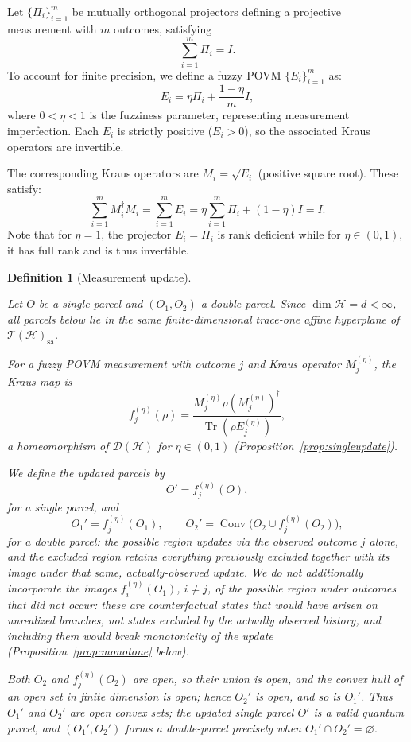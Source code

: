 \documentclass[11pt, onecolumn]{article}
\newtheorem{definition}{Definition}
\begin{document}
Let \(\{\Pi_i\}_{i=1}^m\) be mutually orthogonal projectors defining a projective measurement with $m$ outcomes, satisfying
\[
\sum_{i=1}^m\Pi_i = I.
\]
To account for finite precision, we define a fuzzy POVM \(\{E_i\}_{i=1}^m\) as:
\[
E_i = \eta\Pi_i + \frac{1-\eta}{m}I,
\]
where \(0<\eta<1\) is the fuzziness parameter, representing measurement imperfection. Each \(E_i\) is strictly positive (\(E_i>0\)), so the associated Kraus operators are invertible.

The corresponding Kraus operators are \(M_i=\sqrt{E_i}\) (positive square root). These satisfy:
\[
\sum_{i=1}^m M_i^\dagger M_i = \sum_{i=1}^m E_i = \eta\sum_{i=1}^m\Pi_i+(1-\eta)I = I.
\]
Note that for \(\eta=1\), the projector \(E_i=\Pi_i\) is rank deficient while for \(\eta\in(0,1)\), it has full rank and is thus invertible.

\begin{definition}[Measurement update]
\label{def:update}

Let \(O\) be a single parcel and \((O_1,O_2)\) a double parcel. Since $\dim\mathcal H=d<\infty$, all parcels below lie in the same finite-dimensional trace-one affine hyperplane of $\mathcal T(\mathcal H)_{\mathrm{sa}}$.

For a fuzzy POVM measurement with outcome \(j\) and Kraus operator \(M_j^{(\eta)}\), the Kraus map is
\[
f_j^{(\eta)}(\rho)
=
\frac{M_j^{(\eta)} \rho (M_j^{(\eta)})^\dagger}
     {\operatorname{Tr}(\rho E_j^{(\eta)})},
\]
a homeomorphism of $\mathcal D(\mathcal H)$ for $\eta\in(0,1)$ (Proposition~\ref{prop:singleupdate}).

We define the updated parcels by
\[
O' = f_j^{(\eta)}(O),
\]
for a single parcel, and
\[
O_1' = f_j^{(\eta)}(O_1),
\qquad
O_2' = \operatorname{Conv}\bigl(O_2\cup f_j^{(\eta)}(O_2)\bigr),
\]
for a double parcel: the possible region updates via the observed outcome $j$ alone, and the excluded region retains everything previously excluded together with its image under that same, actually-observed update. We do not additionally incorporate the images $f_i^{(\eta)}(O_1)$, $i\neq j$, of the possible region under outcomes that did \emph{not} occur: these are counterfactual states that would have arisen on unrealized branches, not states excluded by the actually observed history, and including them would break monotonicity of the update (Proposition~\ref{prop:monotone} below).

Both $O_2$ and $f_j^{(\eta)}(O_2)$ are open, so their union is open, and the convex hull of an open set in finite dimension is open; hence $O_2'$ is open, and so is $O_1'$. Thus $O_1'$ and $O_2'$ are open convex sets; the updated single parcel $O'$ is a valid quantum parcel, and $(O_1',O_2')$ forms a double-parcel precisely when $O_1'\cap O_2'=\varnothing$.

\end{definition}
\end{document}
